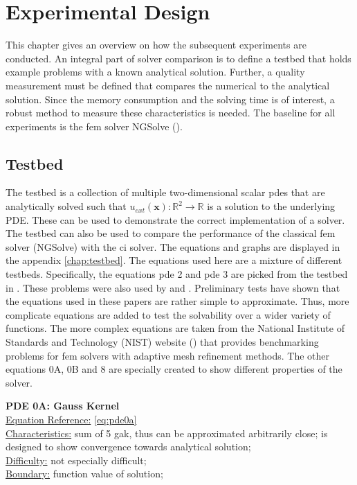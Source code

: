 \documentclass[./\jobname.tex]{subfiles}
\begin{document}
\chapter{Experimental Design}
This chapter gives an overview on how the subsequent experiments are conducted. An integral part of solver comparison is to define a testbed that holds example problems with a known analytical solution. Further, a quality measurement must be defined that compares the numerical to the analytical solution. Since the memory consumption and the solving time is of interest, a robust method to measure these characteristics is needed. The baseline for all experiments is the \gls{fem} solver NGSolve (\cite{schoberl_ngsolvengsolve_2020}). 

\section{Testbed}
\label{chap:testbed_description}
The testbed is a collection of multiple two-dimensional scalar \gls{pde}s that are analytically solved such that $u_{ext}(\mathbf{x}): \mathbb{R}^2 \rightarrow \mathbb{R}$ is a solution to the underlying PDE. These can be used to demonstrate the correct implementation of a solver. The testbed can also be used to compare the performance of the classical \gls{fem} solver (NGSolve) with the \gls{ci} solver. The equations and graphs are displayed in the appendix \ref{chap:testbed}. The equations used here are a mixture of different testbeds. Specifically, the equations \gls{pde} 2 and \gls{pde} 3 are picked from the testbed in \cite{chaquet_using_2019}. These problems were also used by \cite{tsoulos_solving_2006} and \cite{panagant_solving_2014}. Preliminary tests have shown that the equations used in these papers are rather simple to approximate. Thus, more complicate equations are added to test the solvability over a wider variety of functions. The more complex equations are taken from the National Institute of Standards and Technology (NIST) website (\cite{mitchell_nist_2018}) that provides benchmarking problems for \gls{fem} solvers with adaptive mesh refinement methods. The other equations 0A, 0B and 8 are specially created to show different properties of the solver. 

\textbf{PDE 0A: Gauss Kernel} \\
\underline{Equation Reference:} \eqref{eq:pde0a} \\
\underline{Characteristics:} sum of 5 \gls{gak}, thus can be approximated arbitrarily close; is designed to show convergence towards analytical solution; \\
\underline{Difficulty:} not especially difficult; \\
\underline{Boundary:} function value of solution; \\
\end{document}
